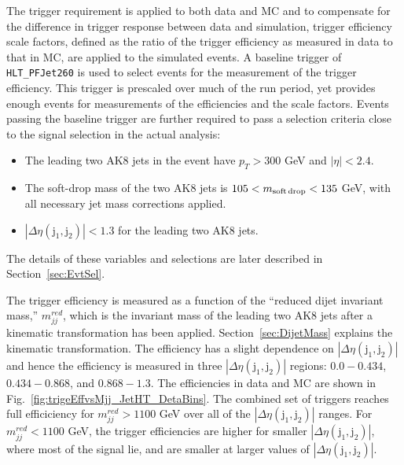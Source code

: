 The trigger requirement is applied to both data and MC and to compensate for the difference in trigger response between data and simulation, trigger efficiency scale factors, defined as the ratio of the trigger efficiency as measured in data to that in MC, are applied to the simulated events. A baseline trigger of \texttt{HLT\_PFJet260} is used to select events for the measurement of the trigger efficiency. This trigger is prescaled over much of the run period, yet provides enough events for measurements of the efficiencies and the scale factors. Events passing the baseline trigger are further required to pass a selection criteria close to the signal selection in the actual analysis:
\begin{itemize}
 \item The leading two AK8 jets in the event have $p_{T} > 300$ GeV and $|\eta| < 2.4$.
 \item The soft-drop mass of the two AK8 jets is $105 < m_{\rm soft\,drop} < 135$ GeV, with all necessary jet mass corrections applied.
 \item $|\Delta\eta(\mathrm{j}_{1}, \mathrm{j}_{2})| < 1.3$ for the leading two AK8 jets.
\end{itemize}

\noindent
The details of these variables and selections are later described in Section~\ref{sec:EvtSel}.

The trigger efficiency is measured as a function of the ``reduced dijet invariant mass,'' $m_{jj}^{red}$, which is the invariant mass of the leading two AK8 jets after a kinematic transformation has been applied. Section~\ref{sec:DijetMass} explains the kinematic transformation. The efficiency has a slight dependence on $|\Delta\eta(\mathrm{j}_{1}, \mathrm{j}_{2})|$ and hence the efficiency is measured in three $|\Delta\eta(\mathrm{j}_{1}, \mathrm{j}_{2})|$ regions: $0.0-0.434$, $0.434-0.868$, and $0.868-1.3$. The efficiencies in data and MC are shown in Fig.~\ref{fig:trigeEffvsMjj_JetHT_DetaBins}. The combined set of triggers reaches full efficiciency for $m_{jj}^{red} > 1100$ GeV over all of the $|\Delta\eta(\mathrm{j}_{1}, \mathrm{j}_{2})|$ ranges. For $m_{jj}^{red} < 1100$ GeV, the trigger efficiencies are higher for smaller $|\Delta\eta(\mathrm{j}_{1}, \mathrm{j}_{2})|$, where most of the signal lie, and are smaller at larger values of $|\Delta\eta(\mathrm{j}_{1}, \mathrm{j}_{2})|$.  

